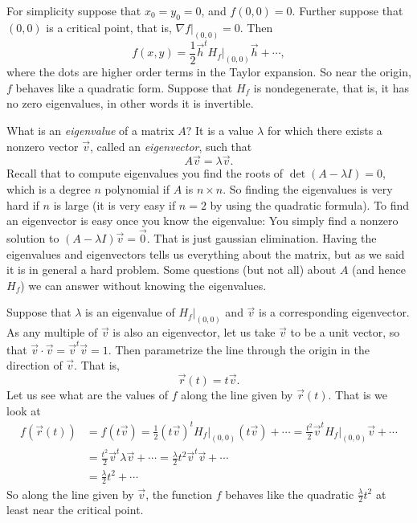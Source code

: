 \documentclass[12pt]{article}
\begin{document}
For simplicity suppose that $x_0 = y_0 = 0$, and $f(0,0) = 0$.
Further suppose that $(0,0)$ is a critical point, that is,
$\nabla f|_{(0,0)} = 0$.  Then
$$
f(x,y) = \frac{1}{2} \vec{h}^{t} H_f\big|_{(0,0)} \vec{h}
+
\cdots ,
$$
where the dots are higher order terms in the Taylor expansion.
So near the origin, $f$ behaves like a quadratic form.
Suppose that $H_f$ is nondegenerate, that is, it has
no zero eigenvalues, in other words it is invertible.

What is an \emph{eigenvalue} of a matrix $A$?
It is a value $\lambda$ for which there exists
a nonzero vector $\vec{v}$, called an \emph{eigenvector}, such that
\begin{equation*}
A \vec{v} = \lambda \vec{v} .
\end{equation*}
Recall that to compute eigenvalues you find the roots of $\det(A-\lambda I)
= 0$, which is a degree $n$ polynomial if $A$ is $n \times n$.  So finding
the eigenvalues is very hard if $n$ is large (it is very easy if $n=2$ by
using the quadratic formula).  To find an eigenvector is easy once you know
the eigenvalue: You simply find a nonzero solution to $(A-\lambda I) \vec{v}
= \vec{0}$.  That is just gaussian elimination.  Having the eigenvalues
and eigenvectors tells us everything about the matrix, but as we said
it is in general a hard problem.  Some questions (but not all)
about $A$ (and hence $H_f$) we can answer without knowing the eigenvalues.

Suppose that $\lambda$ is an eigenvalue of $H_f\big|_{(0,0)}$ and $\vec{v}$ is a
corresponding eigenvector.  As any multiple of $\vec{v}$ is also an
eigenvector, let us take $\vec{v}$ to be a unit vector,
so that $\vec{v} \cdot \vec{v} = \vec{v}^t \vec{v} = 1$.
Then parametrize the line through the origin in the direction
of $\vec{v}$.  That is,
\begin{equation*}
\vec{r}(t) = t\vec{v} .
\end{equation*}
Let us see what are the values of $f$ along the line given by
$\vec{r}(t)$.  That is we look at
\begin{equation*}
\begin{split}
f(\vec{r}(t)) & = 
f(t \vec{v}) = 
\frac{1}{2} (t \vec{v})^{t} H_f\big|_{(0,0)} (t \vec{v})
+
\cdots 
=
\frac{t^2}{2} \vec{v}^{t} H_f\big|_{(0,0)} \vec{v}
+
\cdots 
\\
& =
\frac{t^2}{2} \vec{v}^{t} \lambda \vec{v}
+
\cdots 
=
\frac{\lambda}{2} t^2 \vec{v}^{t} \vec{v}
+
\cdots 
\\
& =
\frac{\lambda}{2} t^2
+
\cdots 
\end{split}
\end{equation*}
So along the line given by $\vec{v}$, the function $f$ behaves like
the quadratic $\frac{\lambda}{2} t^2$ at least near the critical point.
\end{document}
